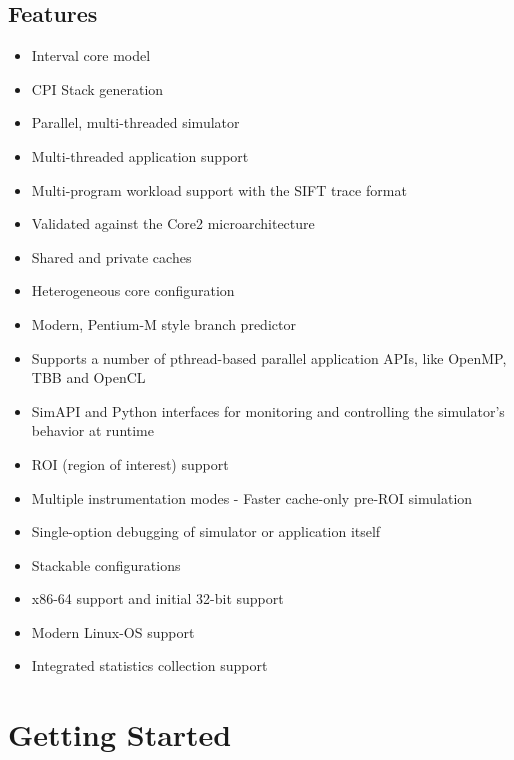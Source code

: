 \documentclass[a4paper,11pt,titlepage]{article}
\begin{document}


\subsection{Features}

  \begin{itemize}
  \item Interval core model
  \item CPI Stack generation
  \item Parallel, multi-threaded simulator
  \item Multi-threaded application support
  \item Multi-program workload support with the SIFT trace format
  \item Validated against the Core2 microarchitecture
  \item Shared and private caches
  \item Heterogeneous core configuration
  \item Modern, Pentium-M style branch predictor
  \item Supports a number of pthread-based parallel application APIs, like OpenMP, TBB and OpenCL
  \item SimAPI and Python interfaces for monitoring and controlling the simulator's behavior at runtime
  \item ROI (region of interest) support
  \item Multiple instrumentation modes - Faster cache-only pre-ROI simulation
  \item Single-option debugging of simulator or application itself
  \item Stackable configurations
  \item x86-64 support and initial 32-bit support
  \item Modern Linux-OS support
  \item Integrated statistics collection support
  \end{itemize}

\section{Getting Started}
\end{document}
